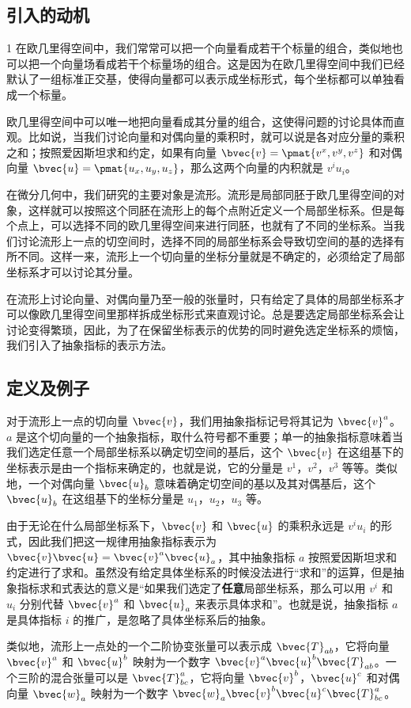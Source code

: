 

\begin{issues}
\issueMissDepend
\end{issues}

\subsection{引入的动机}1
在欧几里得空间中，我们常常可以把一个向量看成若干个标量的组合，类似地也可以把一个向量场看成若干个标量场的组合。这是因为在欧几里得空间中我们已经默认了一组标准正交基，使得向量都可以表示成坐标形式，每个坐标都可以单独看成一个标量。

欧几里得空间中可以唯一地把向量看成其分量的组合，这使得问题的讨论具体而直观。比如说，当我们讨论向量和对偶向量的乘积时，就可以说是各对应分量的乘积之和；按照爱因斯坦求和约定，如果有向量 $\bvec{v}=\pmat{v^x, v^y, v^z}$ 和对偶向量 $\bvec{u}=\pmat{u_x, u_y, u_z}$，那么这两个向量的内积就是 $v^iu_i$。

在微分几何中，我们研究的主要对象是流形。流形是局部同胚于欧几里得空间的对象，这样就可以按照这个同胚在流形上的每个点附近定义一个局部坐标系。但是每个点上，可以选择不同的欧几里得空间来进行同胚，也就有了不同的坐标系。当我们讨论流形上一点的切空间时，选择不同的局部坐标系会导致切空间的基的选择有所不同。这样一来，流形上一个切向量的坐标分量就是不确定的，必须给定了局部坐标系才可以讨论其分量。

在流形上讨论向量、对偶向量乃至一般的张量时，只有给定了具体的局部坐标系才可以像欧几里得空间里那样拆成坐标形式来直观讨论。总是要选定局部坐标系会让讨论变得繁琐，因此，为了在保留坐标表示的优势的同时避免选定坐标系的烦恼，我们引入了抽象指标的表示方法。

\subsection{定义及例子}

对于流形上一点的切向量 $\bvec{v}$，我们用抽象指标记号将其记为 $\bvec{v}^a$。$a$ 是这个切向量的一个抽象指标，取什么符号都不重要；单一的抽象指标意味着当我们选定任意一个局部坐标系以确定切空间的基后，这个 $\bvec{v}$ 在这组基下的坐标表示是由一个指标来确定的，也就是说，它的分量是 $v^1$，$v^2$，$v^3$ 等等。类似地，一个对偶向量 $\bvec{u}_b$ 意味着确定切空间的基以及其对偶基后，这个 $\bvec{u}_b$ 在这组基下的坐标分量是 $u_1$，$u_2$，$u_3$ 等。

由于无论在什么局部坐标系下，$\bvec{v}$ 和 $\bvec{u}$ 的乘积永远是 $v^iu_i$ 的形式，因此我们把这一规律用抽象指标表示为 $\bvec{v}\bvec{u}=\bvec{v}^a\bvec{u}_a$，其中抽象指标 $a$ 按照爱因斯坦求和约定进行了求和。虽然没有给定具体坐标系的时候没法进行“求和”的运算，但是抽象指标求和式表达的意义是“如果我们选定了\textbf{任意}局部坐标系，那么可以用 $v^i$ 和 $u_i$ 分别代替 $\bvec{v}^a$ 和 $\bvec{u}_a$ 来表示具体求和”。也就是说，抽象指标 $a$ 是具体指标 $i$ 的推广，是忽略了具体坐标系后的抽象。

类似地，流形上一点处的一个二阶协变张量可以表示成 $\bvec{T}_{ab}$，它将向量 $\bvec{v}^a$ 和 $\bvec{u}^b$ 映射为一个数字 $\bvec{v}^a\bvec{u}^b\bvec{T}_{ab}$。一个三阶的混合张量可以是 $\bvec{T}^a_{bc}$，它将向量 $\bvec{v}^b$，$\bvec{u}^c$ 和对偶向量 $\bvec{w}_a$ 映射为一个数字 $\bvec{w}_a\bvec{v}^b\bvec{u}^c\bvec{T}_{bc}^a$。





